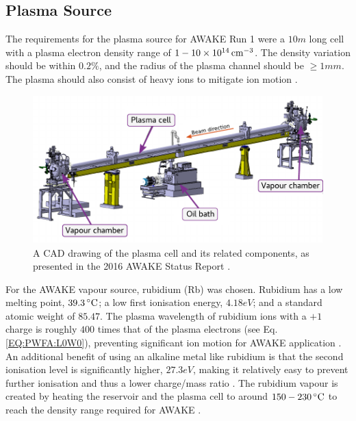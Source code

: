 \subsection{Plasma Source}
\label{WFA:Design:Plasma}

The requirements for the plasma source for AWAKE Run 1 were a $10\unit{m}$ long cell with a plasma electron density range of $1-10\nexp{14}\unit{cm}^{-3}$. The density variation should be within $0.2\%$, and the radius of the plasma channel should be $\geq 1\unit{mm}$. The plasma should also consist of heavy ions to mitigate ion motion \cite{caldwell:2015}.

\begin{figure}[hbt]
    \centering
    \includegraphics[width=0.99\linewidth,trim={0mm 0mm 0mm 0mm},clip]{figures/PlasmaCell}
    \caption{\label{Fig:WFA:PlasmaCell} A CAD drawing of the plasma cell and its related components, as presented in the 2016 AWAKE Status Report \cite{awake_collaboration:2016}.}
\end{figure}

For the AWAKE vapour source, rubidium (Rb) was chosen. Rubidium has a low melting point, $39.3\celsius$; a low first ionisation energy, $4.18\unit{eV}$; and a standard atomic weight of $85.47$. The plasma wavelength of rubidium ions with a $+1$ charge is roughly $400$ times that of the plasma electrons (see Eq. \ref{EQ:PWFA:L0W0}), preventing significant ion motion for AWAKE application \cite{vieira:2012a}. An additional benefit of using an alkaline metal like rubidium is that the second ionisation level is significantly higher, $27.3\unit{eV}$, making it relatively easy to prevent further ionisation and thus a lower charge/mass ratio \cite{awake_collaboration:2017}. The rubidium vapour is created by heating the reservoir and the plasma cell to around $150-230\celsius$ to reach the density range required for AWAKE \cite{caldwell:2015,muggli:2017a}.

